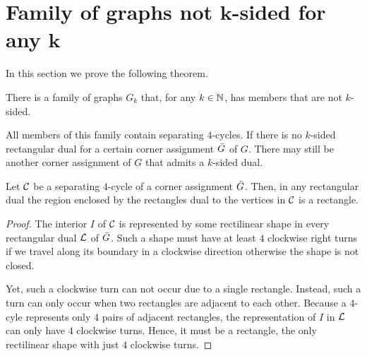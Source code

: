 
\section{Family of graphs not $\mathbf{k}$-sided for any $\mathbf{k}$}
\thispagestyle{plain}
  \label{s:fix}
  In this section we prove the following theorem.

  \begin{thrm}
    \label{fix:th:family}
      There is a family of graphs $G_k$ that, for any $k \in \mathbb{N}$, has members that are not $k$-sided.
  \end{thrm}

  All members of this family contain separating $4$-cycles.
  If there is no $k$-sided rectangular dual for a certain corner assignment $\bar{G}$ of $G$. There may still be another corner assignment of $G$ that admits a $k$-sided dual.

  \begin{lemma}
    \label{lm:interiorRectangle}
    Let $\mathcal{C}$ be a separating $4$-cycle of a corner assignment $\bar{G}$. Then, in any rectangular dual the region enclosed by the rectangles dual to the vertices in $\mathcal{C}$ is a rectangle.
  \end{lemma}
  \begin{proof}
    The interior $I$ of $\mathcal{C}$ is represented by some rectilinear shape in every rectangular dual $\mathcal{L}$ of $\bar{G}$. Such a shape must have at least $4$ clockwise right turns if we travel along its boundary in a clockwise direction otherwise the shape is not closed.

    Yet, such a clockwise turn can not occur due to a single rectangle. Instead, such a turn can only occur when two rectangles are adjacent to each other. Because a $4$-cyle represents only $4$ pairs of adjacent rectangles, the representation of $I$ in $\mathcal{L}$ can only have $4$ clockwise turns. Hence, it must be a rectangle, the only rectilinear shape with just $4$ clockwise turns.
  \end{proof}

